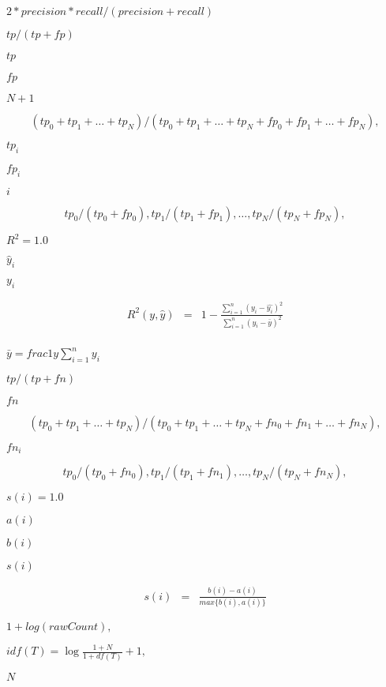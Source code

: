 \documentclass{article}
\begin{document}
$ 2 * precision * recall / (precision + recall) $
\pagebreak

$ tp / (tp + fp) $
\pagebreak

$ tp $
\pagebreak

$ fp $
\pagebreak

$ N + 1 $
\pagebreak

\[ (tp_0 + tp_1 + \ldots + tp_N) / (tp_0 + tp_1 + \ldots + tp_N + fp_0 + fp_1 + \ldots + fp_N), \]
\pagebreak

$ tp_i $
\pagebreak

$ fp_i $
\pagebreak

$ i $
\pagebreak

\[ tp_0 / (tp_0 + fp_0), tp_1 / (tp_1 + fp_1), \ldots, tp_N / (tp_N + fp_N), \]
\pagebreak

$R^2 =1.0$
\pagebreak

$ \hat{y}_i $
\pagebreak

$ y_i $
\pagebreak

\begin{eqnarray*} R^{2} \left( y, \hat{y} \right) &=& 1-\frac{\sum_{i=1}^{n} \left( y_i - \hat{y_i} \right)^2 } {\sum_{i=1}^{n} \left( y_i - \bar{y}\right)^2}\\ \end{eqnarray*}
\pagebreak

$ \bar{y} = frac{1}{y}\sum_{i=1}^{n} y_i $
\pagebreak

$ tp / (tp + fn) $
\pagebreak

$ fn $
\pagebreak

\[ (tp_0 + tp_1 + \ldots + tp_N) / (tp_0 + tp_1 + \ldots + tp_N + fn_0 + fn_1 + \ldots + fn_N), \]
\pagebreak

$ fn_i $
\pagebreak

\[ tp_0 / (tp_0 + fn_0), tp_1 / (tp_1 + fn_1), \ldots, tp_N / (tp_N + fn_N), \]
\pagebreak

$ s(i) = 1.0 $
\pagebreak

$ a(i) $
\pagebreak

$ b(i) $
\pagebreak

$ s(i) $
\pagebreak

\begin{eqnarray*} s(i) &=& \frac{b(i) - a(i)}{max\{b(i), a(i)\}} \end{eqnarray*}
\pagebreak

$ 1 + log(rawCount), $
\pagebreak

$ idf(T) = \log \frac{1 + N}{1 + df(T)} + 1, $
\pagebreak

$ N $
\pagebreak
\end{document}
